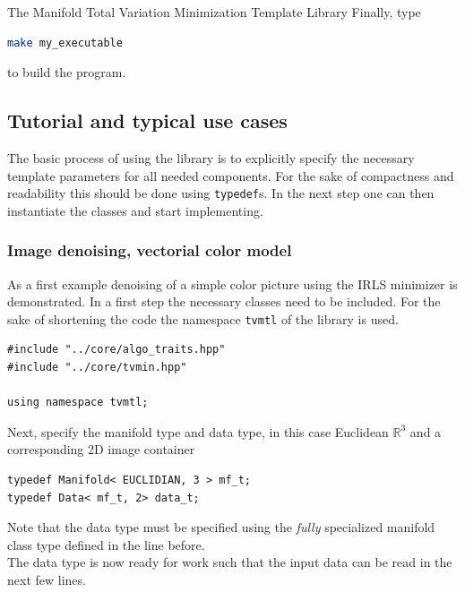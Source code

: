 \begin{chapter}{The Manifold Total Variation Minimization Template Library}
Finally, type
\begin{lstlisting}[language=bash]
make my_executable
\end{lstlisting}
to build the program.


\subsection{Tutorial and typical use cases} %
\label{sub:tutorial}
The basic process of using the library is to explicitly specify the necessary template parameters for all needed components. 
For the sake of compactness and readability this should be done using \texttt{typedef}s. In the next step one can then
instantiate the classes and start implementing.\\

\subsubsection{Image denoising, vectorial color model} %
\label{ssub:Image denoising, vectorial color model}
As a first example denoising of a simple color picture using the IRLS minimizer is demonstrated. In a first step the necessary classes need to be included. For the sake of shortening the 
code the namespace \texttt{tvmtl} of the library is used. \\
\cppinline
\begin{lstlisting}[label=code:tut_include,caption={Inclusion of library headers}]
#include "../core/algo_traits.hpp"
#include "../core/tvmin.hpp"

using namespace tvmtl;
\end{lstlisting}

Next, specify the manifold type and data type, in this case Euclidean $\mathbb{R}^3$ and a corresponding 2D image container\\

\cppinline
\begin{lstlisting}[label=code:tut_typedef,caption={Specification of manifold and data type}]
typedef Manifold< EUCLIDIAN, 3 > mf_t;
typedef Data< mf_t, 2> data_t;
\end{lstlisting}

Note that the data type must be specified using the \textit{fully} specialized manifold class type defined in the line before.\\
The data type is now ready for work such that the input data can be read in the next few lines.\\


\end{chapter}

